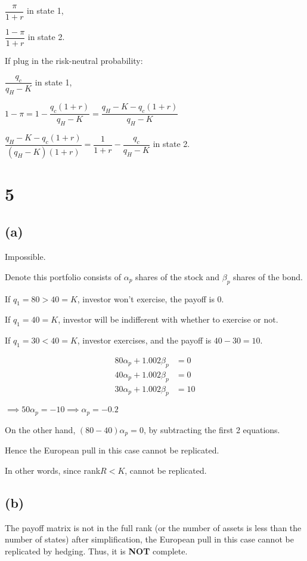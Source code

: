 \documentclass{article}
\begin{document}
$\dfrac{\pi}{1+r}$ in state 1,

$\dfrac{1-\pi}{1+r}$ in state 2.

If plug in the risk-neutral probability:

$\dfrac{q_{c}}{q_{H}-K}$ in state 1,

$1-\pi=1-\dfrac{q_{c}\left(1+r\right)}{q_{H}-K}=\dfrac{q_{H}-K-q_{c}\left(1+r\right)}{q_{H}-K}$

$\dfrac{q_{H}-K-q_{c}\left(1+r\right)}{\left(q_{H}-K\right)\left(1+r\right)}=\dfrac{1}{1+r}-\dfrac{q_{c}}{q_{H}-K}$ in state 2.

\section*{5}

\subsection*{(a)}

Impossible.

Denote this portfolio consists of $\alpha_{p}$ shares of the stock and $\beta_{p}$ shares of the bond.

If $q_{1}=80>40=K$, investor won't exercise, the payoff is $0$.

If $q_{1}=40=K$, investor will be indifferent with whether to exercise or not.

If $q_{1}=30<40=K$, investor exercises, and the payoff is $40-30=10$. 

\begin{align*} 
    80\alpha_{p} + 1.002\beta_{p} &=  0 \\
    40\alpha_{p} + 1.002\beta_{p} &=  0 \\ 
    30\alpha_{p} + 1.002\beta_{p} &=  10
\end{align*}

$\implies 50\alpha_{p}=-10\implies\alpha_{p}=-0.2$

On the other hand, $\left(80-40\right)\alpha_{p}=0$, by subtracting the first 2 equations.

Hence the European pull in this case cannot be replicated.

In other words, since rank$R<K$, cannot be replicated. 

\subsection*{(b)}

The payoff matrix is not in the full rank (or the number of assets is less than the number of states) after simplification, the European pull in this case cannot be replicated by hedging. Thus, it is \textbf{NOT} complete.
\end{document}
